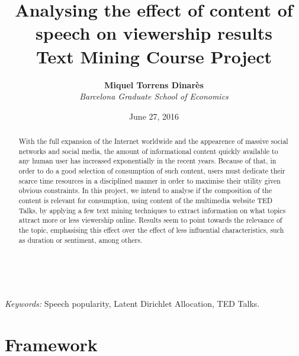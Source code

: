 \documentclass[a4paper, 11pt]{article} %
\title{\textbf{Analysing the effect of content of speech on viewership results}\\ %
\vspace{0.5cm}
{\Large Text Mining Course Project}} %
\author{\textbf{Miquel Torrens Dinar\`es} %
\vspace{0.1cm}
\\{{\large \textit{Barcelona Graduate School of Economics}}}} %
\date{\vspace{0.5cm} {\large June 27, 2016}} %
\makeatletter
\renewcommand{\maketitle}{ %
\begin{flushright} %
{\LARGE\@title} %

\vspace{50pt} %

{\large\@author} %
\\\@date %

\vspace{40pt} %
\end{flushright}
}
\makeatother
\begin{document}
\maketitle %



\begin{abstract}
With the full expansion of the Internet worldwide and the appearence of massive social networks and social media, the amount of informational content quickly available to any human user has increased exponentially in the recent years. Because of that, in order to do a good selection of consumption of such content, users must dedicate their scarce time resources in a disciplined manner in order to maximise their utility given obvious constraints. In this project, we intend to analyse if the composition of the content is relevant for consumption, using content of the multimedia website TED Talks, by applying a few text mining techniques to extract information on what topics attract more or less viewership online. Results seem to point towards the relevance of the topic, emphasising this effect over the effect of less influential characteristics, such as duration or sentiment, among others.
\end{abstract}

\hspace*{3,6mm}\textit{Keywords:} Speech popularity, Latent Dirichlet Allocation, TED Talks. %

\vspace{30pt} %


\section*{Framework}
\end{document}
